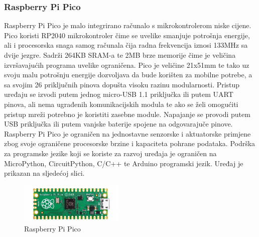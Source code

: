 \documentclass[times, utf8, diplomski]{fer}
\begin{document}
\subsubsection{Raspberry Pi Pico}
Raspberry Pi Pico\citep{RPiPico} je malo integrirano računalo s mikrokontrolerom niske cijene. Pico koristi RP2040 mikrokontroler čime se uvelike smanjuje potrošnja energije, ali i procesorska snaga samog računala čija radna frekvencija iznosi 133MHz sa dvije jezgre. Sadrži 264KB SRAM-a te 2MB brze memorije čime je veličina izvršavajućih programa uvelike ograničena. Pico je veličine 21x51mm te tako uz svoju malu potrošnju energije dozvoljava da bude korišten za mobilne potrebe, a sa svojim 26 priključnih pinova dopušta visoku razinu modularnosti. Pristup uređaju se izvodi putem jednog micro-USB 1.1 priključka ili putem UART pinova, ali nema ugrađenih komunikacijskih modula te ako se želi omogućiti pristup mreži potrebno je koristiti zasebne module. Napajanje se provodi putem USB priključka ili putem vanjske baterije spojene na odgovarajuče pinove. Raspberry Pi Pico je ograničen na jednostavne senzorske i aktuatorske primjene zbog svoje ograničene procesorske brzine i kapaciteta pohrane podataka. Podrška za programske jezike koji se koriste za razvoj uređaja je ograničen na  MicroPython, CircuitPython, C/C++ te Arduino programski jezik. Uređaj je prikazan na sljedećoj slici.
\begin{figure}[htb]
    \centering
    \includegraphics[width=5cm]{images/rpipico.jpg}
    \caption{Raspberry Pi Pico\citep{RPiPicoImg}}
    \label{fig:rpipico}
\end{figure}
\end{document}
